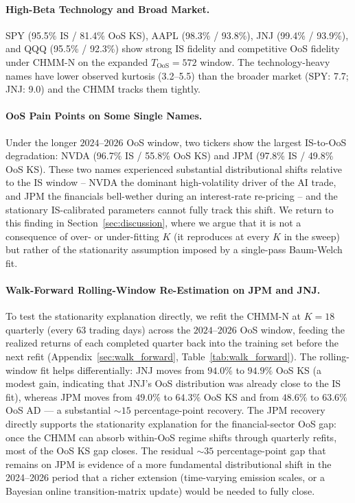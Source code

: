 \paragraph{High-Beta Technology and Broad Market.}
SPY (95.5\% IS / 81.4\% OoS KS), AAPL (98.3\% / 93.8\%), JNJ (99.4\% / 93.9\%), and QQQ (95.5\% / 92.3\%) show strong IS fidelity and competitive OoS fidelity under CHMM-N on the expanded $T_{\text{OoS}} = 572$ window.
The technology-heavy names have lower observed kurtosis (3.2--5.5) than the broader market (SPY: 7.7; JNJ: 9.0) and the CHMM tracks them tightly.

\paragraph{OoS Pain Points on Some Single Names.}
Under the longer $2024$--$2026$ OoS window, two tickers show the largest IS-to-OoS degradation: NVDA (96.7\% IS / 55.8\% OoS KS) and JPM (97.8\% IS / 49.8\% OoS KS).
These two names experienced substantial distributional shifts relative to the IS window -- NVDA the dominant high-volatility driver of the AI trade, and JPM the financials bell-wether during an interest-rate re-pricing -- and the stationary IS-calibrated parameters cannot fully track this shift.
We return to this finding in Section~\ref{sec:discussion}, where we argue that it is not a consequence of over- or under-fitting $K$ (it reproduces at every $K$ in the sweep) but rather of the stationarity assumption imposed by a single-pass Baum-Welch fit.

\paragraph{Walk-Forward Rolling-Window Re-Estimation on JPM and JNJ.}
To test the stationarity explanation directly, we refit the CHMM-N at $K = 18$ quarterly (every $63$ trading days) across the $2024$--$2026$ OoS window, feeding the realized returns of each completed quarter back into the training set before the next refit (Appendix~\ref{sec:walk_forward}, Table~\ref{tab:walk_forward}).
The rolling-window fit helps differentially: JNJ moves from $94.0\%$ to $94.9\%$ OoS KS (a modest gain, indicating that JNJ's OoS distribution was already close to the IS fit), whereas JPM moves from $49.0\%$ to $64.3\%$ OoS KS and from $48.6\%$ to $63.6\%$ OoS AD --- a substantial $\sim 15$ percentage-point recovery.
The JPM recovery directly supports the stationarity explanation for the financial-sector OoS gap: once the CHMM can absorb within-OoS regime shifts through quarterly refits, most of the OoS KS gap closes.
The residual $\sim 35$ percentage-point gap that remains on JPM is evidence of a more fundamental distributional shift in the 2024--2026 period that a richer extension (time-varying emission scales, or a Bayesian online transition-matrix update) would be needed to fully close.

